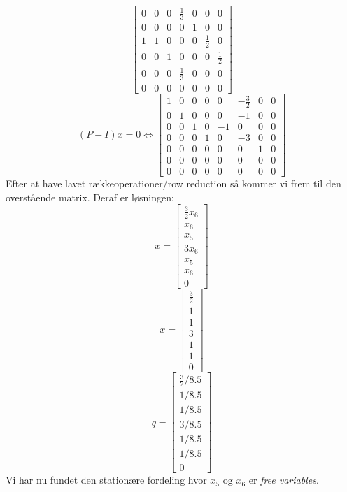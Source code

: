 \documentclass[10pt,a4paper]{article}
\begin{document}
\begin{enumerate}
\[\begin{bmatrix}
		0 & 0 & 0 & \frac{1}{3} & 0 & 0 & 0 \\
		0 & 0 & 0 & 0 & 1 & 0 & 0 \\
		1 & 1 & 0 & 0 & 0 & \frac{1}{2} & 0 \\
		0 & 0 & 1 & 0 & 0 & 0 & \frac{1}{2} \\
		0 & 0 & 0 & \frac{1}{3} & 0 & 0 & 0 \\
		0 & 0 & 0 & 0 & 0 & 0 & 0
	\end{bmatrix}
	\]
	\[
	(P-I)x=0 \Longleftrightarrow \begin{bmatrix}
		1 & 0 & 0 & 0 & 0 & -\frac{3}{2} & 0 & 0 \\
		0 & 1 & 0 & 0 & 0 & -1 & 0 & 0 \\
		0 & 0 & 1 & 0 & -1 & 0 & 0 & 0 \\
		0 & 0 & 0 & 1 & 0 & -3 & 0 & 0 \\
		0 & 0 & 0 & 0 & 0 & 0 & 1 & 0 \\
		0 & 0 & 0 & 0 & 0 & 0 & 0 & 0 \\
		0 & 0 & 0 & 0 & 0 & 0 & 0 & 0
	\end{bmatrix}
	\]
	Efter at have lavet rækkeoperationer/row reduction så kommer vi frem til den overstående matrix. Deraf er løsningen:
		\[
		x=
		\begin{bmatrix}
			\frac{3}{2}x_6\\x_6\\x_5\\3x_6\\x_5\\x_6\\0 	
		\end{bmatrix}
		\]
		\[
		x=\begin{bmatrix}
			\frac{3}{2}\\1\\1\\3\\1\\1\\0
		\end{bmatrix}
		\]
		\[
		\]
		\[
		q=\begin{bmatrix}
			\frac{3}{2}/8.5 \\ 1/8.5 \\ 1/8.5 \\ 3/8.5 \\ 1/8.5 \\ 1/8.5 \\ 0
		\end{bmatrix}
		\]
		Vi har nu fundet den stationære fordeling hvor $x_5$ og $x_6$ er \textit{free variables}.
	

\end{enumerate}
\end{document}
